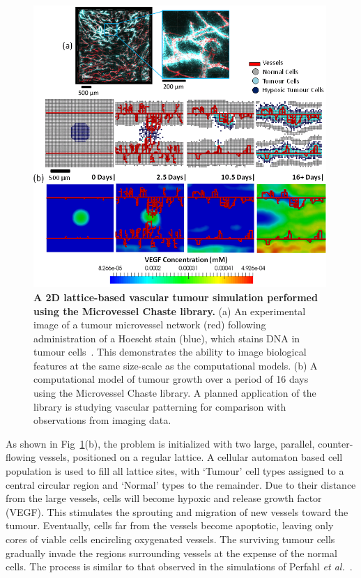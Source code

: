 \documentclass[10pt,letterpaper]{article}
\begin{document}
\begin{figure}[!h]
\centering
\includegraphics[width=0.99\textwidth]{Fig3.png}
\caption{{\bf A 2D lattice-based vascular tumour simulation performed using the Microvessel Chaste library.}
(a) An experimental image of a tumour microvessel network (red) following administration of a Hoescht stain (blue), which stains DNA in tumour cells~\cite{Grogan2016}. This demonstrates the ability to image biological features at the same size-scale as the computational models. (b) A computational model of tumour growth over a period of 16 days using the Microvessel Chaste library. A planned application of the library is studying vascular patterning for comparison with observations from imaging data.}
\label{fig3}
\end{figure}

As shown in Fig~\ref{fig3}(b), the problem is initialized with two large, parallel, counter-flowing vessels, positioned on a regular lattice. A cellular automaton based cell population is used to fill all lattice sites, with `Tumour' cell types assigned to a central circular region and `Normal' types to the remainder. Due to their distance from the large vessels, cells will become hypoxic and release growth factor (VEGF). This stimulates the sprouting and migration of new vessels toward the tumour. Eventually, cells far from the vessels become apoptotic, leaving only cores of viable cells encircling oxygenated vessels. The surviving tumour cells gradually invade the regions surrounding vessels at the expense of the normal cells. The process is similar to that observed in the simulations of Perfahl \emph{et al.}~\cite{Perfahl2011}.
\end{document}
